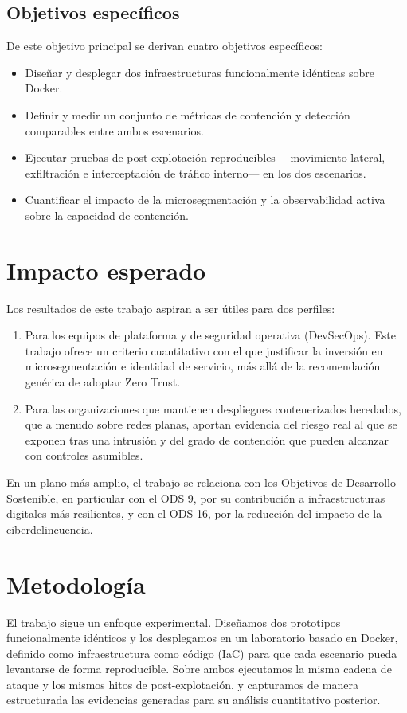 \documentclass[11pt,spanish,listoffigures,listoftables]{tfgetsinf}
\begin{document}
        \subsection{Objetivos específicos}
        De este objetivo principal se derivan cuatro objetivos específicos:
        \begin{itemize}
            \item Diseñar y desplegar dos infraestructuras funcionalmente idénticas sobre Docker.
            \item Definir y medir un conjunto de métricas de contención y detección comparables entre ambos escenarios.
            \item Ejecutar pruebas de post-explotación reproducibles —movimiento lateral, exfiltración e interceptación de tráfico interno— en los dos escenarios.
            \item Cuantificar el impacto de la microsegmentación y la observabilidad activa sobre la capacidad de contención.
        \end{itemize}

    \section{Impacto esperado}
    Los resultados de este trabajo aspiran a ser útiles para dos perfiles:
    \begin{enumerate}
        \item Para los equipos de plataforma y de seguridad operativa (DevSecOps). Este trabajo ofrece un criterio cuantitativo con el que justificar la inversión en microsegmentación e identidad de servicio, más allá de la recomendación genérica de adoptar Zero Trust. 
        \item Para las organizaciones que mantienen despliegues contenerizados heredados, que a menudo sobre redes planas, aportan evidencia del riesgo real al que se exponen tras una intrusión y del grado de contención que pueden alcanzar con controles asumibles.
    \end{enumerate}
    
    En un plano más amplio, el trabajo se relaciona con los Objetivos de Desarrollo Sostenible, en particular con el ODS 9, por su contribución a infraestructuras digitales más resilientes, y con el ODS 16, por la reducción del impacto de la ciberdelincuencia. 
    
    \section{Metodología}
    El trabajo sigue un enfoque experimental. Diseñamos dos prototipos funcionalmente idénticos y los desplegamos en un laboratorio basado en Docker, definido como infraestructura como código (IaC) para que cada escenario pueda levantarse de forma reproducible. Sobre ambos ejecutamos la misma cadena de ataque y los mismos hitos de post-explotación, y capturamos de manera estructurada las evidencias generadas para su análisis cuantitativo posterior.
\end{document}
